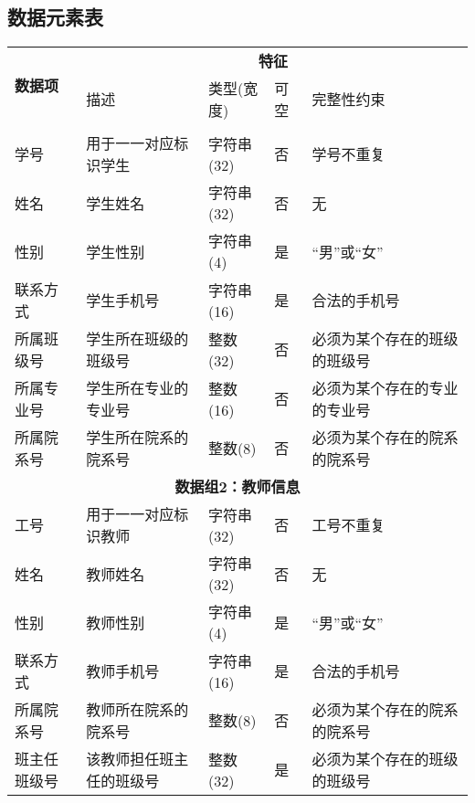 \subsection{数据元素表}

\begin{center}
    \footnotesize
    \begin{longtable}{p{6em}p{16em}p{8em}@{}p{2em}p{16em}}
        \toprule
        \multirow{2}{*}{\textbf{数据项}} &
            \multicolumn{4}{c}{\textbf{特征}} \\
        \cmidrule{2-5}
        & 描述 & 类型(宽度) & 可空 & 完整性约束 \\
        \midrule
        \endhead
        \bottomrule
        \endfoot

        \multicolumn{5}{c}{\textbf{数据组1：学生信息}} \\
        \midrule
        学号 & 用于一一对应标识学生 & 字符串(32) & 否 & 学号不重复 \\
        姓名 & 学生姓名 & 字符串(32) & 否 & 无 \\
        性别 & 学生性别 & 字符串(4) & 是 & “男”或“女” \\
        联系方式 & 学生手机号 & 字符串(16) & 是 & 合法的手机号 \\
        所属班级号 & 学生所在班级的班级号 & 整数(32) & 否 & 必须为某个存在的班级的班级号 \\
        所属专业号 & 学生所在专业的专业号 & 整数(16) & 否 & 必须为某个存在的专业的专业号 \\
        所属院系号 & 学生所在院系的院系号 & 整数(8) & 否 & 必须为某个存在的院系的院系号 \\
        \midrule
        
        \multicolumn{5}{c}{\textbf{数据组2：教师信息}} \\
        \midrule
        工号 & 用于一一对应标识教师 & 字符串(32) & 否 & 工号不重复 \\
        姓名 & 教师姓名 & 字符串(32) & 否 & 无 \\
        性别 & 教师性别 & 字符串(4) & 是 & “男”或“女” \\
        联系方式 & 教师手机号 & 字符串(16) & 是 & 合法的手机号 \\
        所属院系号 & 教师所在院系的院系号 & 整数(8) & 否 & 必须为某个存在的院系的院系号 \\
        班主任班级号 & 该教师担任班主任的班级号 & 整数(32) & 是 & 必须为某个存在的班级的班级号 \\
        \midrule
        

\end{longtable}
\end{center}
